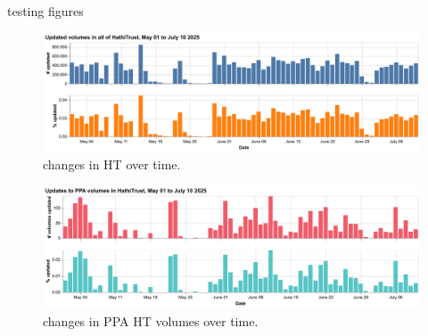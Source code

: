 \documentclass{anthology-ch}         %
\begin{document}
testing figures


\begin{figure}[t!]
  \centering
  \includegraphics[width=\linewidth]{figures/hathitrust_changes.pdf}
  \caption{changes in HT over time.}
  \label{fig:ht_updates}
\end{figure}


\begin{figure}[t!]
  \centering
  \includegraphics[width=\linewidth]{figures/ppa_hathitrust_changes.pdf}
  \caption{changes in PPA HT volumes over time.}
  \label{fig:ppa_ht_updates}
\end{figure}
\end{document}
